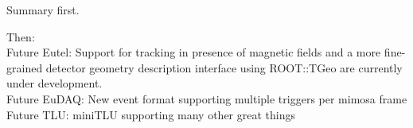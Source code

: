  
Summary first. 
 
Then:\\ 
Future Eutel:
Support for tracking in presence of magnetic fields and a more fine-grained detector geometry description interface using ROOT::TGeo are currently under development.\\

Future EuDAQ:
New event format supporting multiple triggers per mimosa frame\\

Future TLU:
miniTLU supporting many other great things\\
